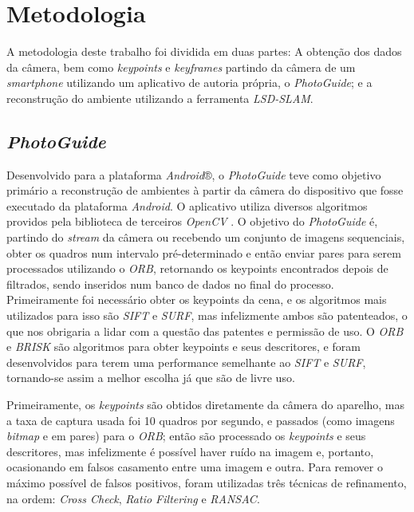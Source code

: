 \chapter{Metodologia}

A metodologia deste trabalho foi dividida em duas partes: A obtenção dos dados da câmera, bem como \textit{keypoints} e \textit{keyframes} partindo da câmera de um \textit{smartphone} utilizando um aplicativo de autoria própria, o \textit{PhotoGuide}; e a reconstrução do ambiente utilizando a ferramenta \textit{LSD-SLAM}.


\section{\textit{PhotoGuide}}

Desenvolvido para a plataforma \textit{Android}®, o \textit{PhotoGuide} \cite{PhotoGuide} teve como objetivo primário a reconstrução de ambientes à partir da câmera do dispositivo que fosse executado da plataforma \textit{Android}. O aplicativo utiliza diversos algoritmos providos pela biblioteca de terceiros \textit{OpenCV} \cite{OpenCV}. O objetivo do \textit{PhotoGuide} é, partindo do \textit{stream} da câmera ou recebendo um conjunto de imagens sequenciais, obter os quadros num intervalo pré-determinado e então enviar pares para serem processados utilizando o \textit{ORB}, retornando os keypoints encontrados depois de filtrados, sendo inseridos num banco de dados no final do processo.  Primeiramente foi necessário obter os keypoints da cena, e os algoritmos mais utilizados para isso são \textit{SIFT} e \textit{SURF}, mas infelizmente ambos são patenteados, o que nos obrigaria a lidar com a questão das patentes e permissão de uso. O \textit{ORB} e \textit{BRISK} são algoritmos para obter keypoints e seus descritores, e foram desenvolvidos para terem uma performance semelhante ao \textit{SIFT} e\textit{ SURF}, tornando-se assim a melhor escolha já que são de livre uso.

Primeiramente, os \textit{keypoints} são obtidos diretamente da câmera do aparelho, mas a taxa de captura usada foi 10 quadros por segundo, e passados (como imagens \textit{bitmap} e em pares) para o \textit{ORB}; então são processado os \textit{keypoints} e seus descritores, mas infelizmente é possível haver ruído na imagem e, portanto, ocasionando em falsos casamento entre uma imagem e outra. Para remover o máximo possível de falsos positivos, foram utilizadas três técnicas de refinamento, na ordem: \textit{Cross Check}, \textit{Ratio Filtering} e \textit{RANSAC}.

